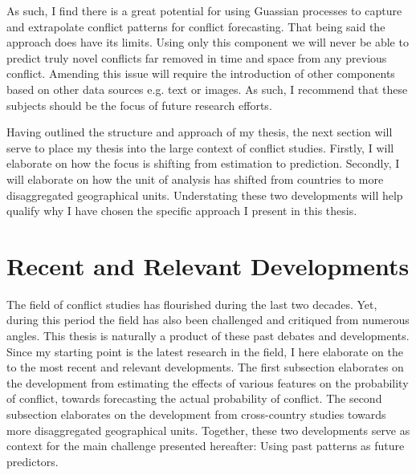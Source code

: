 \documentclass[a4paper]{article}
\begin{document}

As such, I find there is a great potential for using Guassian processes to capture and extrapolate conflict patterns for conflict forecasting. That being said the approach does have its limits. Using only this component we will never be able to predict truly novel conflicts far removed in time and space from any previous conflict. Amending this issue will require the introduction of other components based on other data sources e.g. text or images. As such, I recommend that these subjects should be the focus of future research efforts.\par 

Having outlined the structure and approach of my thesis, the next section will serve to place my thesis into the large context of conflict studies. Firstly, I will elaborate on how the focus is shifting from estimation to prediction. Secondly, I will elaborate on how the unit of analysis has shifted from countries to more disaggregated geographical units. Understating these two developments will help qualify why I have chosen the specific approach I present in this thesis.\par

\section{Recent and Relevant Developments}\label{challenges}


The field of conflict studies has flourished during the last two decades. Yet, during this period the field has also been challenged and critiqued from numerous angles. This thesis is naturally a product of these past debates and developments. Since my starting point is the latest research in the field, I here elaborate on the to the most recent and relevant developments. The first subsection elaborates on the development from estimating the effects of various features on the probability of conflict, towards forecasting the actual probability of conflict. The second subsection elaborates on the development from cross-country studies towards more disaggregated geographical units. Together, these two developments serve as context for the main challenge presented hereafter: Using past patterns as future predictors.\par
\end{document}
